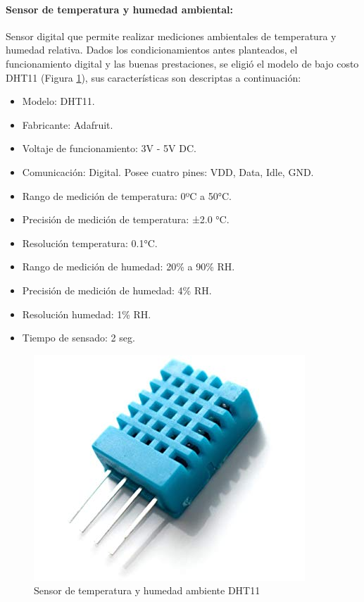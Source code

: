             \paragraph{Sensor de temperatura y humedad ambiental:}Sensor digital que permite realizar mediciones ambientales de temperatura y humedad relativa. Dados los condicionamientos antes planteados, el funcionamiento digital y las buenas prestaciones, se eligió el modelo de bajo costo DHT11 (Figura \ref{SensorDHT11}), sus características son descriptas a continuación:
                \begin{itemize}
                    \item Modelo: DHT11.
                    \item Fabricante: Adafruit.
                    \item Voltaje de funcionamiento: 3V - 5V DC.
                    \item Comunicación: Digital. Posee cuatro pines: VDD, Data, Idle, GND.
                    \item Rango de medición de temperatura: 0ºC a 50°C.
                    \item Precisión de medición de temperatura: ±2.0 °C.
                    \item Resolución temperatura: 0.1°C.
                    \item Rango de medición de humedad: 20\% a 90\% RH.
                    \item Precisión de medición de humedad: 4\% RH.
                    \item Resolución humedad: 1\% RH.
                    \item Tiempo de sensado: 2 seg.
                \end{itemize}
                
                \begin{figure} [h]
                    \centering
                    \includegraphics[scale=0.35]{hardware/dht11_.jpg}
                    \caption{Sensor de temperatura y humedad ambiente DHT11}
                    \label{SensorDHT11}
                \end{figure}

